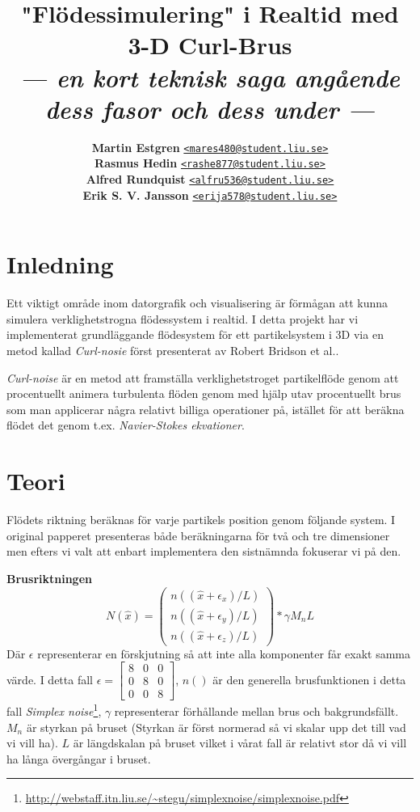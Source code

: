 \documentclass[a4paper]{article}
\title{\vspace{-2.5cm}\textbf{"Flödessimulering" i Realtid med 3-D Curl-Brus}\\
       \Large{\textit{--- en kort teknisk saga angående dess fasor och dess under ---}}}
\author{{\textbf{Martin Estgren}}\;\;\;\;\;\; {\href{mailto:mares480@student.liu.se}{\texttt{<mares480@student.liu.se>}}}\\
        {\textbf{Rasmus Hedin}}\;\;\;\;\;\;\;\; {\href{mailto:rashe877@student.liu.se}{\texttt{<rashe877@student.liu.se>}}}\\
        {\textbf{Alfred Rundquist}}\;\;\; {\href{mailto:alfru536@student.liu.se}{\texttt{<alfru536@student.liu.se>}}}\\
        {\textbf{Erik S. V. Jansson}}\; {\href{mailto:erija578@student.liu.se}{\texttt{<erija578@student.liu.se>}}}}
\begin{document}
    \maketitle

    \section{Inledning}

    Ett viktigt område inom datorgrafik och visualisering är förmågan att kunna simulera verklighetstrogna flödessystem i realtid. I detta projekt har vi implementerat grundläggande flödesystem för ett partikelsystem i 3D via en metod kallad \textit{Curl-nosie} först presenterat av Robert Bridson et al.\cite{bridson2007curl}.

    \textit{Curl-noise} är en metod att framställa verklighetstroget partikelflöde genom att procentuellt animera turbulenta flöden genom med hjälp utav procentuellt brus som man applicerar några relativt billiga operationer på, istället för att beräkna flödet det genom t.ex. \textit{Navier-Stokes ekvationer}. 

    \section{Teori}

    Flödets riktning beräknas för varje partikels position genom följande system. I original papperet presenteras både beräkningarna för två och tre dimensioner men efters vi valt att enbart implementera den sistnämnda fokuserar vi på den.

    \textbf{Brusriktningen}
    \begin{equation}
   N(\hat{x}) =  
        \begin{pmatrix}
        n((\hat{x} + \epsilon_x)/L)
        \\
        n((\hat{x} + \epsilon_y)/L)
        \\ 
        n((\hat{x} + \epsilon_z)/L)
        \end{pmatrix} * \gamma M_nL
    \end{equation}
    Där $\epsilon$ representerar en förskjutning så att inte alla komponenter får exakt samma värde. I detta fall $\epsilon = \begin{bmatrix}
8 & 0 & 0\\ 
0 & 8 & 0\\ 
0 & 0 & 8
\end{bmatrix}$, $n()$ är den generella brusfunktionen i detta fall \textit{Simplex noise}\footnote{\url{http://webstaff.itn.liu.se/~stegu/simplexnoise/simplexnoise.pdf}}, $\gamma$ representerar förhållande mellan brus och bakgrundsfällt. $M_n$ är styrkan på bruset (Styrkan är först normerad så vi skalar upp det till vad vi vill ha). $L$ är längdskalan på bruset vilket i vårat fall är relativt stor då vi vill ha långa övergångar i bruset.
\end{document}
